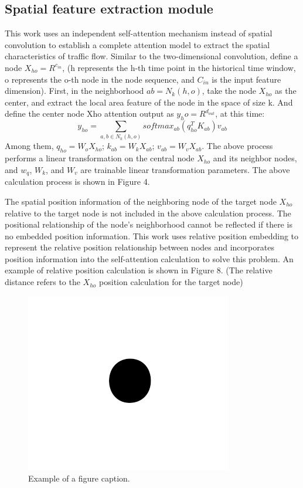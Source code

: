 \documentclass[conference]{IEEEtran}
\begin{document}
\subsection{Spatial feature extraction module}
This work uses an independent self-attention mechanism instead of spatial convolution to establish a complete attention model to extract the spatial characteristics of traffic flow. Similar to the two-dimensional convolution, define a node $X_{ho} = R^{c_{in}}$, (h represents the h-th time point in the historical time window, o represents the o-th node in the node sequence, and $C_{in}$ is the input feature dimension). First, in the neighborhood $ab = N_k(h,o)$, take the node $X_{ho}$ as the center, and extract the local area feature of the node in the space of size k. And define the center node Xho attention output as $y_ho=R^{d_{out}}$, at this time:
\begin{equation}
    y_{ho} = \sum_{a,b \in N_k(h,o)} softmax_{ab}(q_{ho}^TK_{ab})v_{ab}
\end{equation}
Among them, $q_{ho}=W_oX_{ho}$; $k_{ab} = W_kX_{ab}$; $v_{ab}=W_vX_{ab}$. The above process performs a linear transformation on the central node $X_{ho}$ and its neighbor nodes, and $w_q$, $W_k$, and $W_v$ are trainable linear transformation parameters. The above calculation process is shown in Figure 4.
\par
The spatial position information of the neighboring node of the target node $X_{ho}$ relative to the target node is not included in the above calculation process. The positional relationship of the node's neighborhood cannot be reflected if there is no embedded position information. This work uses relative position embedding to represent the relative position relationship between nodes and incorporates position information into the self-attention calculation to solve this problem. An example of relative position calculation is shown in Figure 8. (The relative distance refers to the $X_{ho}$ position calculation for the target node)
\begin{figure}[htbp]
    \centerline{\includegraphics{fig1.png}}
    \caption{Example of a figure caption.}
    \label{fig}
\end{figure}
\end{document}
